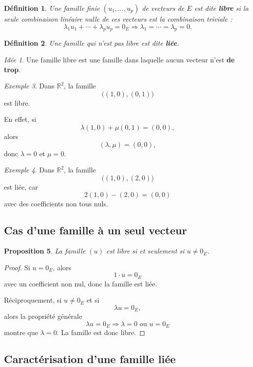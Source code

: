 \documentclass[11pt,a4paper]{article}
\newtheorem{definition}{Définition}[section]
\newtheorem{proposition}[definition]{Proposition}
\theoremstyle{remark}
\newtheorem{exemple}[definition]{Exemple}
\newtheorem*{idee}{Idée}
\newcommand{\R}{\mathbb{R}}
\begin{document}
\begin{definition}
Une famille finie \((u_1,\dots,u_p)\) de vecteurs de \(E\) est dite \textbf{libre} si la seule combinaison linéaire nulle de ces vecteurs est la combinaison triviale :
\[
\lambda_1u_1+\cdots+\lambda_pu_p=0_E
\Longrightarrow
\lambda_1=\cdots=\lambda_p=0.
\]
\end{definition}

\begin{definition}
Une famille qui n’est pas libre est dite \textbf{liée}.
\end{definition}

\begin{idee}
Une famille libre est une famille dans laquelle aucun vecteur n’est \textbf{de trop}.
\end{idee}

\begin{exemple}
Dans \(\R^2\), la famille
\[
\big((1,0),(0,1)\big)
\]
est libre.

En effet, si
\[
\lambda(1,0)+\mu(0,1)=(0,0),
\]
alors
\[
(\lambda,\mu)=(0,0),
\]
donc \(\lambda=0\) et \(\mu=0\).
\end{exemple}

\begin{exemple}
Dans \(\R^2\), la famille
\[
\big((1,0),(2,0)\big)
\]
est liée, car
\[
2(1,0)-(2,0)=(0,0)
\]
avec des coefficients non tous nuls.
\end{exemple}

\subsection{Cas d’une famille à un seul vecteur}

\begin{proposition}
La famille \((u)\) est libre si et seulement si \(u\neq 0_E\).
\end{proposition}

\begin{proof}
Si \(u=0_E\), alors
\[
1\cdot u=0_E
\]
avec un coefficient non nul, donc la famille est liée.

Réciproquement, si \(u\neq 0_E\) et si
\[
\lambda u=0_E,
\]
alors la propriété générale
\[
\lambda u=0_E \Longrightarrow \lambda=0 \text{ ou } u=0_E
\]
montre que \(\lambda=0\). La famille est donc libre.
\end{proof}

\subsection{Caractérisation d’une famille liée}
\end{document}
